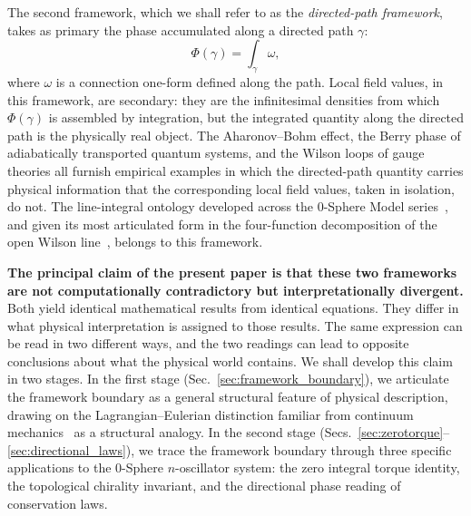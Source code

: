 \documentclass[%
 reprint, amsmath,amssymb, aps, prb, ]{revtex4-2}
\numberwithin{equation}{section}
\begin{document}
The second framework, which we shall refer to as the \emph{directed-path framework}, takes as primary the phase accumulated along a directed path $\gamma$:
\begin{equation}
\Phi(\gamma) = \int_\gamma \omega,
\label{eq:path_integral_primary}
\end{equation}
where $\omega$ is a connection one-form defined along the path. Local field values, in this framework, are secondary: they are the infinitesimal densities from which $\Phi(\gamma)$ is assembled by integration, but the integrated quantity along the directed path is the physically real object. The Aharonov--Bohm effect, the Berry phase of adiabatically transported quantum systems, and the Wilson loops of gauge theories all furnish empirical examples in which the directed-path quantity carries physical information that the corresponding local field values, taken in isolation, do not. The line-integral ontology developed across the 0-Sphere Model series~\cite{hanamura31, hanamura29, hanamura30}, and given its most articulated form in the four-function decomposition of the open Wilson line~\cite{hanamura55}, belongs to this framework.

\textbf{The principal claim of the present paper is that these two frameworks are not computationally contradictory but interpretationally divergent.} Both yield identical mathematical results from identical equations. They differ in what physical interpretation is assigned to those results. The same expression can be read in two different ways, and the two readings can lead to opposite conclusions about what the physical world contains. We shall develop this claim in two stages. In the first stage (Sec.~\ref{sec:framework_boundary}), we articulate the framework boundary as a general structural feature of physical description, drawing on the Lagrangian--Eulerian distinction familiar from continuum mechanics~\cite{hanamura55} as a structural analogy. In the second stage (Secs.~\ref{sec:zerotorque}--\ref{sec:directional_laws}), we trace the framework boundary through three specific applications to the 0-Sphere $n$-oscillator system: the zero integral torque identity, the topological chirality invariant, and the directional phase reading of conservation laws.
\end{document}
